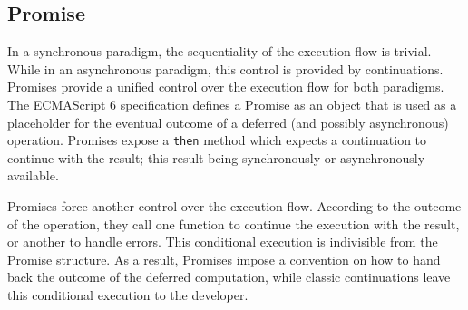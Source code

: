\subsection{Promise} \label{section:definitions:promise}



In a synchronous paradigm, the sequentiality of the execution flow is trivial.
While in an asynchronous paradigm, this control is provided by continuations.
Promises provide a unified control over the execution flow for both paradigms.
The ECMAScript 6 specification defines a Promise as an object that is used as a placeholder for the eventual outcome of a deferred (and possibly asynchronous) operation.
Promises expose a \texttt{then} method which expects a continuation to continue with the result; this result being synchronously or asynchronously available.


Promises force another control over the execution flow.
According to the outcome of the operation, they call one function to continue the execution with the result, or another to handle errors.
This conditional execution is indivisible from the Promise structure.
As a result, Promises impose a convention on how to hand back the outcome of the deferred computation, while classic continuations leave this conditional execution to the developer.

